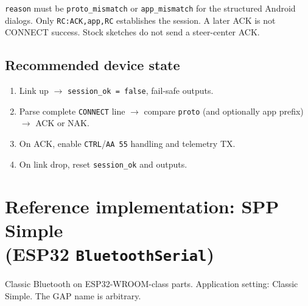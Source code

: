 \documentclass[12pt,a4paper]{article}
\begin{document}
\texttt{reason} must be \texttt{proto\_mismatch} or \texttt{app\_mismatch}
for the structured Android dialogs.
Only \texttt{RC:ACK,app,RC} establishes the session. A later ACK is not
CONNECT success. Stock sketches do not send a steer-center ACK.

\subsection{Recommended device state}

\begin{enumerate}[leftmargin=1.6cm]
  \item Link up $\rightarrow$ \texttt{session\_ok = false}, fail-safe outputs.
  \item Parse complete \texttt{CONNECT} line $\rightarrow$ compare
        \texttt{proto} (and optionally app prefix) $\rightarrow$ ACK or NAK.
  \item On ACK, enable \texttt{CTRL}/\texttt{AA 55} handling and telemetry TX.
  \item On link drop, reset \texttt{session\_ok} and outputs.
\end{enumerate}

\section{\texorpdfstring{Reference implementation: SPP Simple\\[0.15em](ESP32 \texttt{BluetoothSerial})}{Reference implementation: SPP Simple (ESP32 BluetoothSerial)}}
\label{sec:code-esp32}

Classic Bluetooth on ESP32-WROOM-class parts.
Application setting: Classic Simple.
The GAP name is arbitrary.
\end{document}
